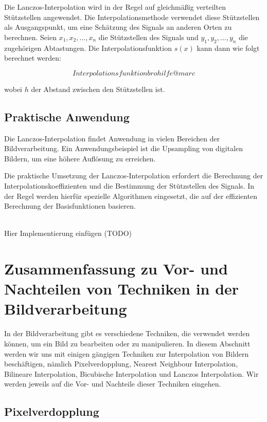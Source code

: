 Die Lanczos-Interpolation wird in der Regel auf gleichmäßig verteilten Stützstellen angewendet. 
Die Interpolationsmethode verwendet diese Stützstellen als Ausgangspunkt, um eine Schätzung des Signals an anderen Orten zu berechnen. 
Seien $x_1, x_2, \ldots, x_n$ die Stützstellen des Signals und $y_1, y_2, \ldots, y_n$ die zugehörigen Abtastungen. Die Interpolationsfunktion $s(x)$ kann dann wie folgt berechnet werden:

\begin{equation}
Interpolationsfunktion bro hilfe @marc
\end{equation}

wobei $h$ der Abstand zwischen den Stützstellen ist.

\subsection{Praktische Anwendung}

Die Lanczos-Interpolation findet Anwendung in vielen Bereichen der Bildverarbeitung. 
Ein Anwendungsbeispiel ist die Upsampling von digitalen Bildern, um eine höhere Auflösung zu erreichen.

Die praktische Umsetzung der Lanczos-Interpolation erfordert die Berechnung der Interpolationskoeffizienten und die Bestimmung der Stützstellen des Signals. 
In der Regel werden hierfür spezielle Algorithmen eingesetzt, die auf der effizienten Berechnung der Basisfunktionen basieren.

\\Hier Implementierung einfügen (TODO) 

\section{Zusammenfassung zu Vor- und Nachteilen von Techniken in der Bildverarbeitung}

In der Bildverarbeitung gibt es verschiedene Techniken, die verwendet werden können, um ein Bild zu bearbeiten oder zu manipulieren. 
In diesem Abschnitt werden wir uns mit einigen gängigen Techniken zur Interpolation von Bildern beschäftigen, nämlich Pixelverdopplung, Nearest Neighbour Interpolation, Bilineare Interpolation, Bicubische Interpolation und Lanczos Interpolation. 
Wir werden jeweils auf die Vor- und Nachteile dieser Techniken eingehen.

\subsection{Pixelverdopplung}

